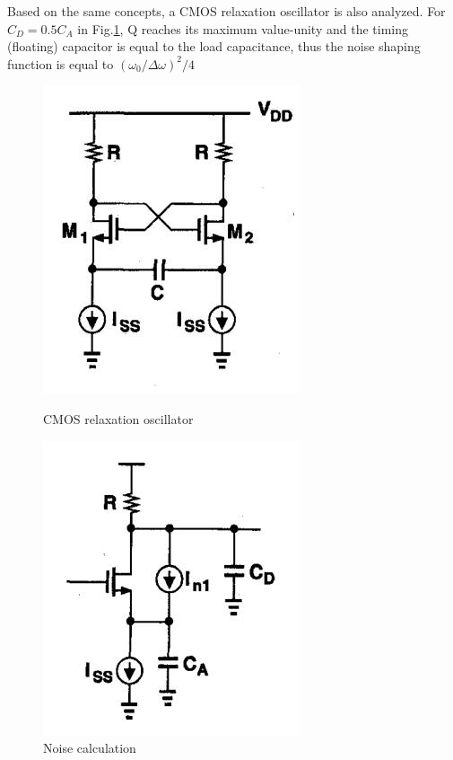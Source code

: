 \documentclass[conference]{IEEEtran}
\begin{document}
Based on the same concepts, a CMOS relaxation oscillator is also
analyzed. For $C_D=0.5C_A$ in Fig.\ref{fig3-4}, Q reaches its maximum value-unity and the timing (floating) capacitor is equal to the load capacitance, thus the noise shaping function is equal to $(\omega_0/\Delta\omega)^2/4$

\begin{figure}[htbp]
	\centering
	\begin{minipage}{0.49\linewidth}
		\centering
		\includegraphics[width=0.7\linewidth]{fig/pic3-3.jpg}
		\caption{CMOS relaxation oscillator}
		\label{fig3-3}%
	\end{minipage}
	\begin{minipage}{0.49\linewidth}
		\centering
		\includegraphics[width=0.7\linewidth]{fig/pic3-4.jpg}
		\caption{Noise calculation}
		\label{fig3-4}%
	\end{minipage}
\end{figure}
\end{document}
